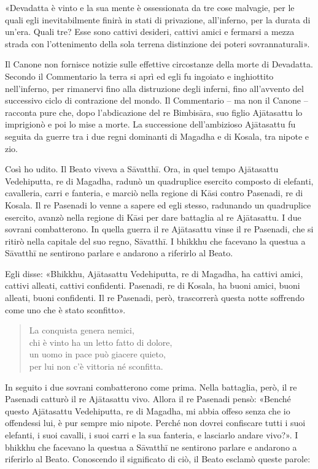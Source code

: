 «Devadatta è vinto e la sua mente è ossessionata da tre cose malvagie,
per le quali egli inevitabilmente finirà in stati di privazione,
all’inferno, per la durata di un’era. Quali tre? Esse sono cattivi
desideri, cattivi amici e fermarsi a mezza strada con l’ottenimento
della sola terrena distinzione dei poteri sovrannaturali».




 Il Canone non fornisce notizie sulle effettive
circostanze della morte di Devadatta. Secondo il Commentario la terra si
aprì ed egli fu ingoiato e inghiottito nell’inferno, per rimanervi fino
alla distruzione degli inferni, fino all’avvento del successivo ciclo di
contrazione del mondo. Il Commentario – ma non il Canone – racconta pure
che, dopo l’abdicazione del re Bimbisāra, suo figlio Ajātasattu lo
imprigionò e poi lo mise a morte. La successione dell’ambizioso
Ajātasattu fu seguita da guerre tra i due regni dominanti di Magadha e
di Kosala, tra nipote e zio.


 Così ho udito. Il Beato viveva a Sāvatthī. Ora, in quel
tempo Ajātasattu Vedehiputta, re di Magadha, radunò un quadruplice
esercito composto di elefanti, cavalleria, carri e fanteria, e marciò
nella regione di Kāsi contro Pasenadi, re di Kosala. Il re Pasenadi lo
venne a sapere ed egli stesso, radunando un quadruplice esercito, avanzò
nella regione di Kāsi per dare battaglia al re Ajātasattu. I due sovrani
combatterono. In quella guerra il re Ajātasattu vinse il re Pasenadi,
che si ritirò nella capitale del suo regno, Sāvatthī. I bhikkhu che
facevano la questua a Sāvatthī ne sentirono parlare e andarono a
riferirlo al Beato.


Egli disse: «Bhikkhu, Ajātasattu Vedehiputta, re di Magadha, ha cattivi amici,
cattivi alleati, cattivi confidenti. Pasenadi, re di Kosala, ha buoni
amici, buoni alleati, buoni confidenti. Il re Pasenadi, però,
trascorrerà questa notte soffrendo come uno che è stato sconfitto».


\begin{quote}
La conquista genera nemici, \\
chi è vinto ha un letto fatto di dolore, \\
un uomo in pace può giacere quieto, \\
per lui non c’è vittoria né sconfitta.
\end{quote}

In seguito i due sovrani combatterono come prima. Nella battaglia, però,
il re Pasenadi catturò il re Ajātasattu vivo. Allora il re Pasenadi
pensò: «Benché questo Ajātasattu Vedehiputta, re di Magadha, mi abbia
offeso senza che io offendessi lui, è pur sempre mio nipote. Perché non
dovrei confiscare tutti i suoi elefanti, i suoi cavalli, i suoi carri e
la sua fanteria, e lasciarlo andare vivo?». I bhikkhu che facevano la
questua a Sāvatthī ne sentirono parlare e andarono a riferirlo al Beato.
Conoscendo il significato di ciò, il Beato esclamò queste parole:


